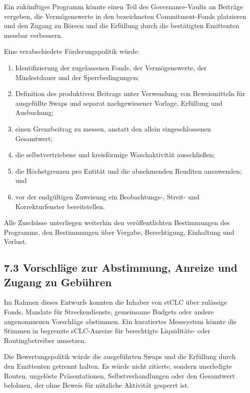 \documentclass[11pt]{article}
\begin{document}
Ein zukünftiges Programm könnte einen Teil des Governance-Vaults an Beiträge vergeben, die Vermögenswerte in den bezeichneten Commitment-Fonds platzieren und den Zugang zu Börsen und die Erfüllung durch die bestätigten Emittenten messbar verbessern.

Eine verabschiedete Förderungspolitik würde:

\begin{enumerate}[leftmargin=*]
\item Identifizierung der zugelassenen Fonds, der Vermögenswerte, der Mindestdauer und der Sperrbedingungen;
\item Definition des produktiven Beitrags unter Verwendung von Beweismitteln für ausgefüllte Swaps und separat nachgewiesener Vorlage, Erfüllung und Ausbuchung;
\item einen Grenzbeitrag zu messen, anstatt den allein eingeschlossenen Gesamtwert;
\item die selbstvertriebene und kreisförmige Waschaktivität ausschließen;
\item die Höchstgrenzen pro Entität und die abnehmenden Renditen anzuwenden; und
\item vor der endgültigen Zuweisung ein Beobachtungs-, Streit- und Korrekturfenster bereitstellen.
\end{enumerate}
Alle Zuschüsse unterliegen weiterhin den veröffentlichten Bestimmungen des Programms, den Bestimmungen über Vergabe, Berechtigung, Einhaltung und Verlust.

\subsection*{7.3 Vorschläge zur Abstimmung, Anreize und Zugang zu Gebühren}

Im Rahmen dieses Entwurfs konnten die Inhaber von stCLC über zulässige Fonds, Mandate für Streckendienste, gemeinsame Budgets oder andere angenommenen Vorschläge abstimmen. Ein kuratiertes Messsystem könnte die Stimmen in begrenzte sCLC-Anreize für berechtigte Liquiditäts- oder Routingbetreiber umsetzen.

Die Bewertungspolitik würde die ausgeführten Swaps und die Erfüllung durch den Emittenten getrennt halten. Es würde nicht zitierte, sondern unerledigte Routen, ungelöste Präsentationen, Selbstverhandlungen oder den Gesamtwert belohnen, der ohne Beweis für nützliche Aktivität gesperrt ist.
\end{document}
